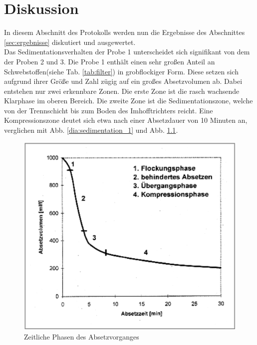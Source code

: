 \chapter{Diskussion}
\label{sec:diskussion}
In diesem Abschnitt des Protokolls werden nun die Ergebnisse des Abschnittes \ref{sec:ergebnisse} diskutiert und ausgewertet.\\


Das Sedimentationsverhalten der Probe 1 unterscheidet sich signifikant von dem der Proben 2 und 3. Die Probe 1 enthält einen sehr großen Anteil an Schwebstoffen\linebreak (siehe Tab. \ref{tab:filter}) in grobflockiger Form. Diese setzen sich aufgrund ihrer Größe und Zahl zügig auf ein großes Absetzvolumen ab. Dabei entstehen nur zwei erkennbare Zonen. Die erste Zone ist die rasch wachsende Klarphase im oberen Bereich. Die zweite Zone ist die Sedimentationszone, welche von der Trennschicht bis zum Boden des Imhofftrichters reicht. Eine Kompressionszone deutet sich etwa nach einer Absetzdauer von 10 Minuten an, verglichen mit Abb. \ref{dia:sedimentation_1} und Abb. \ref{fig:Absetzphasen-merkel1971}.\\
 \begin{figure}[h!]
\centering
\includegraphics[width=0.6\linewidth]{img/Absetzphasen_merkel1971}
\caption{Zeitliche Phasen des Absetzvorganges \cite{merkel1971untersuchungen}}
\label{fig:Absetzphasen-merkel1971}
\end{figure}
\FloatBarrier




